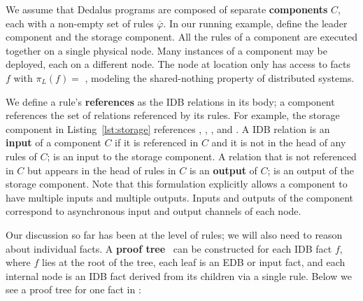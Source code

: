 We assume that Dedalus programs are composed of separate \textbf{components} $C$, each with a non-empty set of rules $\overline{\varphi}$.
In our running example,  define the leader component and the storage component.
All the rules of a component are executed together on a single physical node.
Many instances of a component may be deployed, each on a different node.
The node at location  only has access to facts $f$ with $\pi_L(f) =$ , modeling 
the shared-nothing property of distributed systems.

We define a rule's \textbf{references} as the IDB relations in its body; a component
references the set of relations referenced by its rules.
For example,
the storage component in Listing~\ref{lst:storage} references , , , and .
A IDB relation is an \textbf{input} of a component $C$ if it is referenced in $C$ and it is not in the head of any rules of $C$;  is an input to the storage component.
A relation that is not referenced in $C$ but appears in the head of rules in $C$ is an \textbf{output} of $C$;  is an output of the storage component. 
Note that this formulation explicitly allows a component to have multiple inputs and multiple outputs.
Inputs and outputs of the component correspond to asynchronous input and output channels of each node.


Our discussion so far has been at the level of rules; we will also need to reason about individual facts. 
A \textbf{proof tree}~\cite{alice} can be constructed for each IDB fact $f$, where $f$ lies at the root of the tree,
each leaf is an EDB or input fact, and each internal node is an IDB fact derived from its children via a single rule.
Below we see
a proof tree for one fact in :

